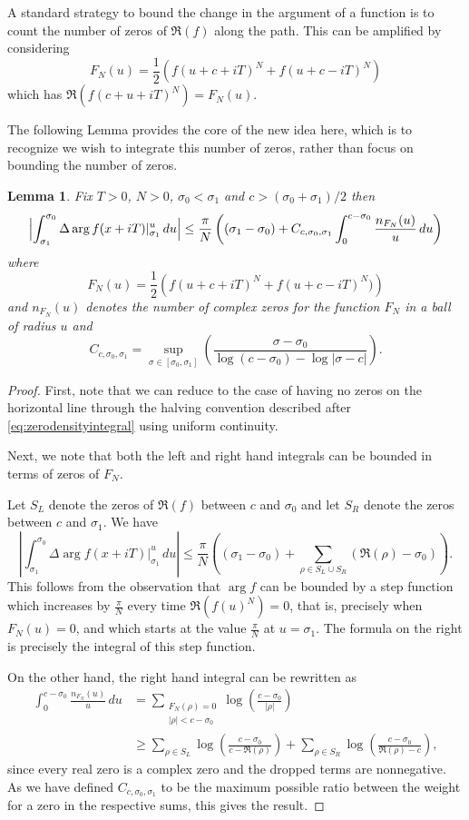 \documentclass[10pt,english,letter, reqno]{amsart}
\theoremstyle{plain}
\newtheorem{lemma}[theorem]{Lemma}
\theoremstyle{definition}
\begin{document}
A standard strategy to bound the change in the argument of a function is to count the number of zeros of $\Re(f)$ along the path.
This can be amplified by considering 
\[ F_N(u) = \frac{1}{2}\left(f(u+c+iT)^N + f(u+c-iT)^N\right) \]
which has $\Re(f(c+u+iT)^N) = F_N(u)$.

The following Lemma provides the core of the new idea here, which is to recognize we wish to integrate this number of zeros, rather than focus on bounding the number of zeros.
\begin{lemma}\label{lem:integralofarg}
Fix $T>0$, $N>0$, $\sigma_0<\sigma_1$ and $c>(\sigma_0+\sigma_1)/2$ then
\[ \Bigl|\int_{\sigma_1}^{\sigma_0} \Delta\arg f( x + i T)|_{\sigma_1}^u\,du\Bigr| \leq \frac{\pi}{N}\left( (\sigma_1-\sigma_0) + C_{c,\sigma_0,\sigma_1}\int_0^{c-\sigma_0} \frac{n_{F_N}(u)}{u}\,du \right) \]
where
\[  F_N(u) = \frac{1}{2}\left(f(u+c+iT)^N + f(u+c-iT)^N)\right) \]
and $n_{F_N}(u)$ denotes the number of complex zeros for the function $F_N$ in a ball of radius $u$ and
\[ C_{c,\sigma_0,\sigma_1}= \sup_{\sigma\in[\sigma_0,\sigma_1]}\left(\frac{\sigma - \sigma_0}{\log(c-\sigma_0)-\log|\sigma -c|} \right). \]
\end{lemma}
\begin{proof}
First, note that we can reduce to the case of having no zeros on the horizontal line through the halving convention described after \eqref{eq:zerodensityintegral} using uniform continuity. 

Next, we note that both the left and right hand integrals can be bounded in terms of zeros of $F_N$.

Let $S_L$ denote the zeros of $\Re(f)$ between $c$ and $\sigma_0$ and let $S_R$ denote the zeros between $c$ and $\sigma_1$.
We have
\[ \left|\int_{\sigma_1}^{\sigma_0} \Delta\arg f( x + i T)|_{\sigma_1}^u\,du \right| \leq \frac{\pi}{N} \left((\sigma_1-\sigma_0)+ \sum_{\rho\in S_L\cup S_R} (\Re(\rho) -\sigma_0) \right). \]
This follows from the observation that $\arg f$ can be bounded by a step function which increases by $\frac{\pi}{N}$ every time $\Re(f(u)^N) = 0$, that is, precisely when $F_N(u) = 0$, and which starts at the value $\frac{\pi}{N}$ at $u=\sigma_1$.
The formula on the right is precisely the integral of this step function.

On the other hand, the right hand integral can be rewritten as
\begin{align*}
\int_0^{c-\sigma_0} \frac{n_{F_N}(u)}{u}\,du
& = \sum_{\substack{F_N(\rho)=0\\ |\rho|<c-\sigma_0}} \log\left(\frac{c-\sigma_0}{|\rho|}\right)
\\ &\geq \sum_{\rho\in S_L} \log\left(\frac{c-\sigma_0}{c-\Re(\rho)}\right)
+ \sum_{\rho\in S_R}   \log\left(\frac{c-\sigma_0}{\Re(\rho)-c}\right),
\end{align*}
since every real zero is a complex zero and the dropped terms are nonnegative.
As we have defined $C_{c,\sigma_0,\sigma_1}$ to be the maximum possible ratio between the weight for a zero in the respective sums, this gives the result.
\end{proof}
\end{document}
